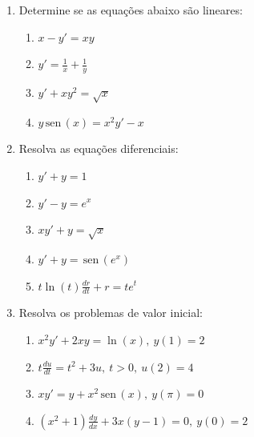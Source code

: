 \documentclass[a4paper,5pt]{amsbook}
\newcommand{\sen}{\,\mbox{sen}\,}
\newcommand{\ds}{\displaystyle}
\begin{document}
\vspace{1cm}
\begin{enumerate}
	\vspace{0.5cm}
    \item Determine se as equa\c{c}\~oes abaixo s\~ao lineares:
        \begin{enumerate}
            \vspace{0.3cm}
            \item $\ds x-y'=xy$
            \vspace{0.3cm}
            \item $\ds y'=\frac{1}{x}+\frac{1}{y}$
            \vspace{0.3cm}
            \item $\ds y'+xy^2=\sqrt{x}$
            \vspace{0.3cm}
            \item $\ds y \sen(x) = x^2y'-x$
        \end{enumerate}

    \vspace{0.5cm}
    \item Resolva as equa\c{c}\~oes diferenciais:
        \begin{enumerate}
            \vspace{0.3cm}
            \item $\ds y'+y=1$
            \vspace{0.3cm}
            \item $\ds y'-y=e^x$
            \vspace{0.3cm}
            \item $\ds xy'+y=\sqrt{x}$
            \vspace{0.3cm}
            \item $\ds y'+y=\sen(e^x)$
            \vspace{0.3cm}
            \item $\ds t \ln(t) \frac{dr}{dt}+r=te^t$
        \end{enumerate}

    \vspace{0.5cm}
    \item Resolva os problemas de valor inicial:
        \begin{enumerate}
            \vspace{0.3cm}
            \item $\ds x^2y'+2xy=\ln(x),\ y(1)=2$
            \vspace{0.3cm}
            \item $\ds t \frac{du}{dt} = t^2+3u,\ t>0,\ u(2)=4$
            \vspace{0.3cm}
            \item $\ds xy'=y+x^2\sen(x),\ y(\pi)=0$
            \vspace{0.3cm}
            \item $\ds (x^2+1)\frac{dy}{dx}+3x(y-1)=0,\ y(0)=2$
        \end{enumerate}


\end{enumerate}
\end{document}
